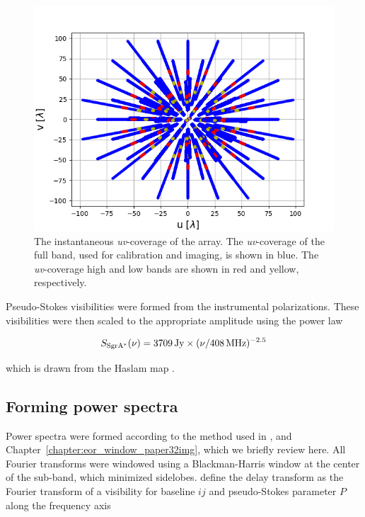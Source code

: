 \begin{figure}
\centering
\includegraphics[scale=0.5]{chapters/eor_window_HERA/figures/uvcoverage_hera19-hilo.png}
\caption[The instantaneous \textit{uv}-coverage of the array.]{The instantaneous \textit{uv}-coverage of the array. The \textit{uv}-coverage of the full band, used for calibration and imaging, is shown in blue. The \textit{uv}-coverage high and low bands are shown in red and yellow, respectively.}
\label{fig:uv-coverage}
\end{figure}

Pseudo-Stokes visibilities were formed from the instrumental polarizations. These visibilities were then scaled to the appropriate amplitude using the power law

\begin{equation}
S_{\rm Sgr A^*}(\nu) =  3709 {\rm\, Jy} \times (\nu/408 {\rm \,MHz})^{-2.5}
\label{eq:freq_scale}
\end{equation}

which is drawn from the Haslam map \citep{Haslam.81, Haslam.82, Remazeilles.15}.

\subsection{Forming power spectra}
\label{subsec:pspec}
Power spectra were formed according to the method used in \cite{Pober.13}, \cite{Kohn.16} and Chapter~\ref{chapter:eor_window_paper32img}, which we briefly review here. All Fourier transforms were windowed using a Blackman-Harris window at the center of the sub-band, which minimized sidelobes. \cite{Parsons.12a} define the delay transform as the Fourier transform of a visibility for baseline $ij$ and pseudo-Stokes parameter $P$ along the frequency axis

